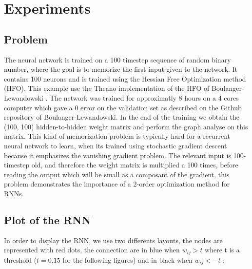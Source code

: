\section{Experiments}

\subsection{Problem}

The neural network is trained on a 100 timestep sequence of random binary number, where the goal is to memorize the first input given to the network. It contains 100 neurons and is trained using the Hessian Free Optimization method (HFO). This example use the Theano implementation of the HFO of Boulanger-Lewandowski \cite{boulanger2012modeling}. The network was trained for approximatly 8 hours on a 4 cores computer which gave a 0 error on the validation set as described on the Github repository of Boulanger-Lewandowski. In the end of the training we obtain the (100, 100) hidden-to-hidden weight matrix and perform the graph analyse on this matrix. This kind of memorization problem is typically hard for a recurrent neural network to learn, when its trained using stochastic gradient descent because it emphasizes the vanishing gradient problem. The relevant input is 100-timestep old, and therefore the weight matrix is multiplied a 100 times, before reading the output which will be small as a composant of the gradient, this problem demonstrates the importance of a 2-order optimization method for RNNs. 

\subsection{Plot of the RNN}

In order to display the RNN, we use two differents layouts, the nodes are represented with red dots, the connection are in blue when $w_{ij}  > t $ where t is a threshold ($ t=0.15$ for the following figures) and in black when $w_{ij} < - t$  :

